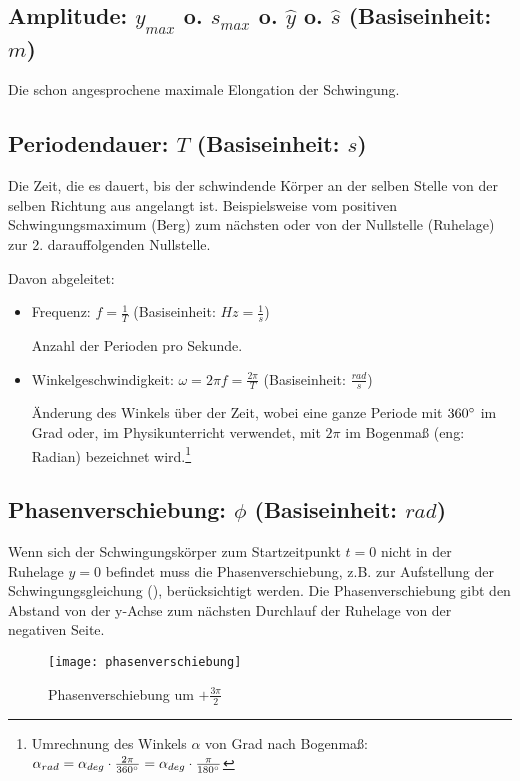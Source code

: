 \subsection[Amplitude]{Amplitude: $y_{max}$ o. $s_{max}$ o. $\hat{y}$ o. $\hat{s}$ (Basiseinheit: $m$)}

Die schon angesprochene maximale Elongation der Schwingung.


\subsection[Periodendauer]{Periodendauer: $T$ (Basiseinheit: $s$)}
	
Die Zeit, die es dauert, bis der schwindende Körper an der selben Stelle von der selben Richtung aus angelangt ist. Beispielsweise vom positiven Schwingungsmaximum (\glqq Berg\grqq) zum nächsten oder von der Nullstelle (\glqq Ruhelage\grqq) zur 2. darauffolgenden Nullstelle.

Davon abgeleitet:
\begin{itemize}
	\item Frequenz: $f=\frac{1}{T}$ (Basiseinheit: $Hz=\frac{1}{s}$)
	
	Anzahl der Perioden pro Sekunde.
	\item Winkelgeschwindigkeit: $\omega=2 \pi f=\frac{2 \pi}{T}$ (Basiseinheit: $\frac{rad}{s}$)
		
	Änderung des Winkels über der Zeit, wobei eine ganze Periode mit $360 \degree$ im Grad oder, im Physikunterricht verwendet, mit $2 \pi$ im Bogenmaß (eng: \glqq Radian\grqq) bezeichnet wird.\footnote{Umrechnung des Winkels $\alpha$ von Grad nach Bogenmaß: $\alpha_{rad} = \alpha_{deg} \cdot \frac{2\pi}{360 \degree} = \alpha_{deg} \cdot \frac{\pi}{180 \degree} $}
\end{itemize}


\subsection[Phasenverschiebung]{Phasenverschiebung: $\phi$ (Basiseinheit: $rad$)}
	
Wenn sich der Schwingungskörper zum Startzeitpunkt $t=0$ nicht in der Ruhelage $y=0$ befindet muss die Phasenverschiebung, z.B. zur Aufstellung der Schwingungsgleichung (), berücksichtigt werden. Die Phasenverschiebung gibt den Abstand von der y-Achse zum nächsten Durchlauf der Ruhelage von der negativen Seite.

\begin{figure}[!h] \label{phasenverschiebung}
	\centering
	\texttt{[image: phasenverschiebung]}
	\begin{comment} 'plot_pitics.p'
set dummy t
set ylabel "s"
set xlabel "t"
set output 'phasenverschiebung.png'
plot sin(t-1.5*pi) ls 1 title 's(t)=sin(t-1.5π)'
	\end{comment}
	\caption{Phasenverschiebung um $+\frac{3\pi}{2}$}
\end{figure}

